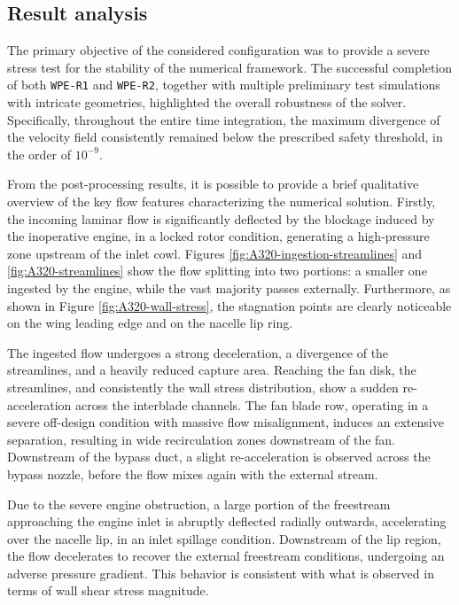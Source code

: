 \documentclass[12pt, a4paper, twoside, openright]{book}
\begin{document}
\clearpage

\subsection{Result analysis}
The primary objective of the considered configuration was to provide a severe stress test for the stability of the numerical framework. The successful completion of both \texttt{WPE-R1} and \texttt{WPE-R2}, together with multiple preliminary test simulations with intricate geometries, highlighted the overall robustness of the solver. Specifically, throughout the entire time integration, the maximum divergence of the velocity field consistently remained below the prescribed safety threshold, in the order of $10^{-9}$.

From the post-processing results, it is possible to provide a brief qualitative overview of the key flow features characterizing the numerical solution. Firstly, the incoming laminar flow is significantly deflected by the blockage induced by the inoperative engine, in a locked rotor condition, generating a high-pressure zone upstream of the inlet cowl. Figures \ref{fig:A320-ingestion-streamlines} and \ref{fig:A320-streamlines} show the flow splitting into two portions: a smaller one ingested by the engine, while the vast majority passes externally. Furthermore, as shown in Figure \ref{fig:A320-wall-stress}, the stagnation points are clearly noticeable on the wing leading edge and on the nacelle lip ring.

The ingested flow undergoes a strong deceleration, a divergence of the streamlines, and a heavily reduced capture area. Reaching the fan disk, the streamlines, and consistently the wall stress distribution, show a sudden re-acceleration across the interblade channels. The fan blade row, operating in a severe off-design condition with massive flow misalignment, induces an extensive separation, resulting in wide recirculation zones downstream of the fan. Downstream of the bypass duct, a slight re-acceleration is observed across the bypass nozzle, before the flow mixes again with the external stream.

Due to the severe engine obstruction, a large portion of the freestream approaching the engine inlet is abruptly deflected radially outwards, accelerating over the nacelle lip, in an inlet spillage condition. Downstream of the lip region, the flow decelerates to recover the external freestream conditions, undergoing an adverse pressure gradient. This behavior is consistent with what is observed in terms of wall shear stress magnitude.
\end{document}
